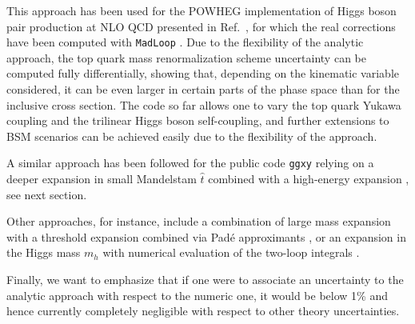 This approach has been used for the POWHEG implementation of Higgs boson pair production at NLO QCD presented in Ref.~\cite{Bagnaschi:2023rbx}, for which the real corrections have been computed with \texttt{MadLoop} \cite{Hirschi:2011pa}. Due to the flexibility of the analytic approach, the top quark mass renormalization scheme uncertainty can be computed fully differentially, showing that, depending on the kinematic variable considered, it can be even larger in certain parts of the phase space than for the inclusive cross section. The code so far allows one to vary the top quark Yukawa coupling and the trilinear Higgs boson self-coupling, and further extensions to BSM scenarios can be achieved easily due to the flexibility of the approach.

A similar approach has been followed for the public code \texttt{ggxy} \cite{Davies:2025qjr} relying on a deeper expansion in small Mandelstam $\hat{t}$ combined with a high-energy expansion \cite{Davies:2023vmj}, see next section.


Other approaches, for instance, include a combination of large mass expansion with a threshold expansion combined via Pad\'e approximants \cite{Grober:2017uho}, or an expansion in the Higgs mass $m_h$ with numerical evaluation of the two-loop integrals \cite{Xu:2018eos}.

Finally, we want to emphasize that if one were to associate an uncertainty to the analytic approach with respect to the numeric one, it would be below 1\% and hence currently completely negligible with respect to other theory uncertainties.
